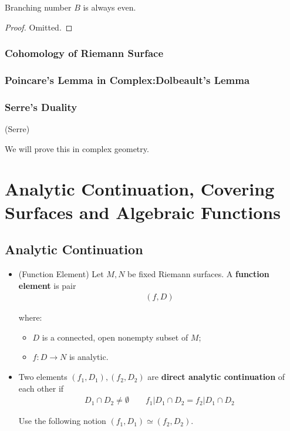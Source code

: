 \documentclass[Total.tex]{subfiles}
\begin{document}
			\begin{corollary}
				Branching number $B$ is always even. 
			\end{corollary}
			\begin{proof}
				Omitted.
			\end{proof}
			
		\subsection{Cohomology of Riemann Surface}
			
		\subsection{Poincare's Lemma in Complex:Dolbeault's Lemma}
			
		\subsection{Serre's Duality}
			\begin{theorem}
				(Serre)
			\end{theorem}
			We will prove this in complex geometry. 
	\chapter{Analytic Continuation, Covering Surfaces and Algebraic Functions}
		\section{Analytic Continuation}
			\begin{Def}
				\begin{itemize}
					\item (Function Element) Let $M,N$ be fixed Riemann surfaces. A \textbf{function element} is pair
					\begin{gather*}
						(f,D)
					\end{gather*}
					
					where:
					\begin{itemize}
						\item $D$ is a connected, open nonempty subset of $M$;
						\item $f:D\rightarrow N$ is analytic. 
					\end{itemize}
					
					\item Two elements $(f_1,D_1),(f_2,D_2)$ are \textbf{direct analytic continuation} of each other if
					\begin{gather*}
						D_1\cap D_2\not=\emptyset\qquad f_1|D_1\cap D_2=f_2|D_1\cap D_2
					\end{gather*}
					
					Use the following notion $(f_1,D_1)\simeq (f_2,D_2)$.
				\end{itemize}
			\end{Def}
			
\end{document}
